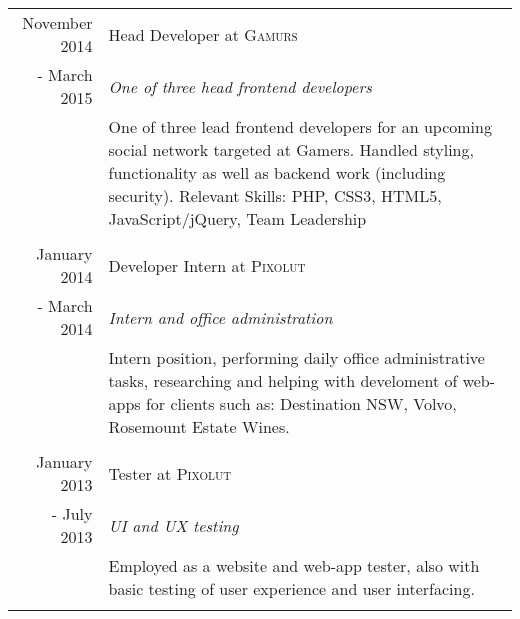 \documentclass[10pt]{article}
\begin{document}
\begin{tabular}{r|p{11cm}}
November 2014 & Head Developer at \textsc{Gamurs} \\ - March 2015 & \emph{One of three head frontend developers} \\& \footnotesize{One of three lead frontend developers for an upcoming social network targeted at Gamers. Handled styling, functionality as well as backend work (including security). Relevant Skills: PHP, CSS3, HTML5, JavaScript/jQuery, Team Leadership} \\ \multicolumn{2}{c}{} \\
January 2014 & Developer Intern at \textsc{Pixolut} \\ - March 2014 & \emph{Intern and office administration}\\ & \footnotesize{Intern position, performing daily office administrative tasks, researching and helping with develoment of web-apps for clients such as: Destination NSW, Volvo, Rosemount Estate Wines.}\\\multicolumn{2}{c}{}\\
January 2013 & Tester at \textsc{Pixolut} \\ - July 2013 & \emph{UI and UX testing}\\ & \footnotesize{Employed as a website and web-app tester, also with basic testing of user experience and user interfacing. }\\\multicolumn{2}{c}{}\\
\end{tabular} 
\newpage
\end{document}
